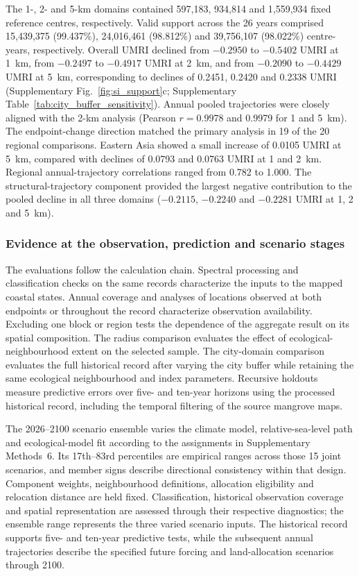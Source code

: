 The 1-, 2- and 5-km domains contained 597,183, 934,814 and 1,559,934 fixed reference centres, respectively. Valid support across the 26 years comprised 15,439,375 (99.437\%), 24,016,461 (98.812\%) and 39,756,107 (98.022\%) centre-years, respectively. Overall UMRI declined from $-0.2950$ to $-0.5402$ UMRI at 1~km, from $-0.2497$ to $-0.4917$ UMRI at 2~km, and from $-0.2090$ to $-0.4429$ UMRI at 5~km, corresponding to declines of 0.2451, 0.2420 and 0.2338 UMRI (Supplementary Fig.~\ref{fig:si_support}c; Supplementary Table~\ref{tab:city_buffer_sensitivity}). Annual pooled trajectories were closely aligned with the 2-km analysis (Pearson $r=0.9978$ and 0.9979 for 1 and 5~km). The endpoint-change direction matched the primary analysis in 19 of the 20 regional comparisons. Eastern Asia showed a small increase of 0.0105 UMRI at 5~km, compared with declines of 0.0793 and 0.0763 UMRI at 1 and 2~km. Regional annual-trajectory correlations ranged from 0.782 to 1.000. The structural-trajectory component provided the largest negative contribution to the pooled decline in all three domains ($-0.2115$, $-0.2240$ and $-0.2281$ UMRI at 1, 2 and 5~km).

\subsubsection{Evidence at the observation, prediction and scenario stages}
The evaluations follow the calculation chain. Spectral processing and classification checks on the same records characterize the inputs to the mapped coastal states. Annual coverage and analyses of locations observed at both endpoints or throughout the record characterize observation availability. Excluding one block or region tests the dependence of the aggregate result on its spatial composition. The radius comparison evaluates the effect of ecological-neighbourhood extent on the selected sample. The city-domain comparison evaluates the full historical record after varying the city buffer while retaining the same ecological neighbourhood and index parameters. Recursive holdouts measure predictive errors over five- and ten-year horizons using the processed historical record, including the temporal filtering of the source mangrove maps.

The 2026--2100 scenario ensemble varies the climate model, relative-sea-level path and ecological-model fit according to the assignments in Supplementary Methods~6. Its 17th--83rd percentiles are empirical ranges across those 15 joint scenarios, and member signs describe directional consistency within that design. Component weights, neighbourhood definitions, allocation eligibility and relocation distance are held fixed. Classification, historical observation coverage and spatial representation are assessed through their respective diagnostics; the ensemble range represents the three varied scenario inputs. The historical record supports five- and ten-year predictive tests, while the subsequent annual trajectories describe the specified future forcing and land-allocation scenarios through 2100.

